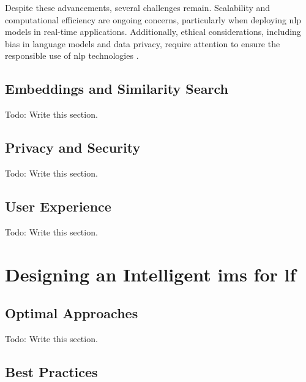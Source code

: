 Despite these advancements, several challenges remain. Scalability and computational efficiency are ongoing concerns, particularly when deploying \ac{nlp} models in real-time applications. Additionally, ethical considerations, including bias in language models and data privacy, require attention to ensure the responsible use of \ac{nlp} technologies \cite{Prawira2024}.


\subsection{Embeddings and Similarity Search} \label{subsec:object-recommendation}

Todo: Write this section.

\subsection{Privacy and Security} \label{subsec:privacy-security}

Todo: Write this section.

\subsection{User Experience} \label{subsec:user-experience}

Todo: Write this section.





\section{Designing an Intelligent \acl{ims} for \acl{lf}} \label{sec:designing-intelligent-ims}

\subsection{Optimal Approaches} \label{subsec:optimal-approaches}

Todo: Write this section.

\subsection{Best Practices} \label{subsec:best-practices}

